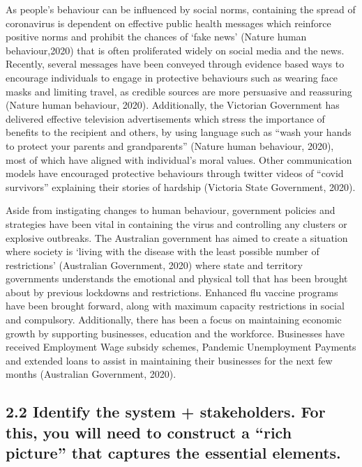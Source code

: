 \documentclass[11pt]{article}
\begin{document}
    As people's behaviour can be influenced by social norms, containing the
spread of coronavirus is dependent on effective public health messages
which reinforce positive norms and prohibit the chances of `fake news'
(Nature human behaviour,2020) that is often proliferated widely on
social media and the news. Recently, several messages have been conveyed
through evidence based ways to encourage individuals to engage in
protective behaviours such as wearing face masks and limiting travel, as
credible sources are more persuasive and reassuring (Nature human
behaviour, 2020). Additionally, the Victorian Government has delivered
effective television advertisements which stress the importance of
benefits to the recipient and others, by using language such as ``wash
your hands to protect your parents and grandparents'' (Nature human
behaviour, 2020), most of which have aligned with individual's moral
values. Other communication models have encouraged protective behaviours
through twitter videos of ``covid survivors'' explaining their stories
of hardship (Victoria State Government, 2020).

    Aside from instigating changes to human behaviour, government policies
and strategies have been vital in containing the virus and controlling
any clusters or explosive outbreaks. The Australian government has aimed
to create a situation where society is `living with the disease with the
least possible number of restrictions' (Australian Government, 2020)
where state and territory governments understands the emotional and
physical toll that has been brought about by previous lockdowns and
restrictions. Enhanced flu vaccine programs have been brought forward,
along with maximum capacity restrictions in social and compulsory.
Additionally, there has been a focus on maintaining economic growth by
supporting businesses, education and the workforce. Businesses have
received Employment Wage subsidy schemes, Pandemic Unemployment Payments
and extended loans to assist in maintaining their businesses for the
next few months (Australian Government, 2020).

    \hypertarget{identify-the-system-stakeholders.-for-this-you-will-need-to-construct-a-rich-picture-that-captures-the-essential-elements.}{%
\subsection{2.2 Identify the system + stakeholders. For this, you will
need to construct a ``rich picture'' that captures the essential
elements.}\label{identify-the-system-stakeholders.-for-this-you-will-need-to-construct-a-rich-picture-that-captures-the-essential-elements.}}
\end{document}
